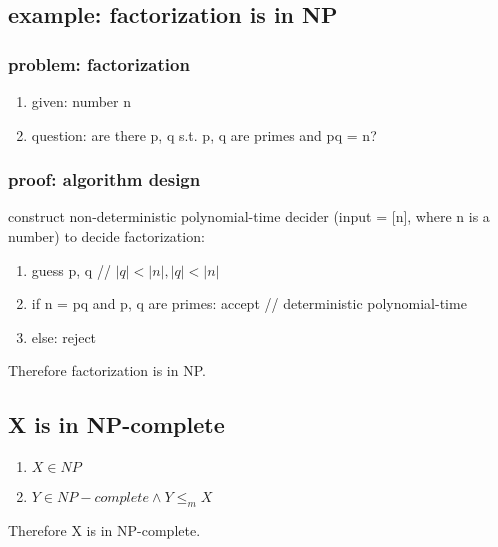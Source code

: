 \documentclass{article}
\begin{document}
\subsection{example: factorization is in NP}

\subsubsection{problem: factorization}
\begin{enumerate}
	\item given: number n
	\item question: are there p, q s.t. p, q are primes and pq = n?
\end{enumerate}

\subsubsection{proof: algorithm design}
construct non-deterministic polynomial-time decider (input = [n], where n is a 
number) to decide factorization:
\begin{enumerate}
	\item guess p, q // $ |q| < |n|, |q| < |n| $
	\item if n = pq and p, q are primes: accept // deterministic polynomial-time
	\item else: reject
\end{enumerate}
Therefore factorization is in NP.

\subsection{X is in NP-complete}
\begin{enumerate}
	\item $ X \in NP $
	\item $ Y \in NP-complete \land Y \leq_m X $
\end{enumerate}
Therefore X is in NP-complete.
\end{document}
